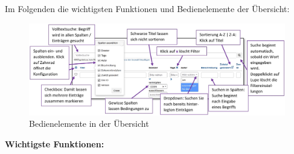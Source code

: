 Im Folgenden die wichtigsten Funktionen und Bedienelemente der Übersicht:

\begin{figure}[H]
\hspace*{-2.3cm}
\includegraphics[width=1.25\linewidth]{../chapters/02_GettingStarted/pictures/uebersicht_Bedienung}
\caption{Bedienelemente in der Übersicht}
\end{figure}



\textbf{Wichtigste Funktionen:}

\vspace{\baselineskip}

